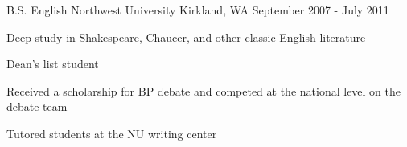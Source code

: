 

\begin{cventries}

  \cventry
    {B.S. English} %
    {Northwest University} %
    {Kirkland, WA} %
    {September 2007 - July 2011} %
    {
      \begin{cvitems} %
        \item {Deep study in Shakespeare, Chaucer, and other classic English literature}
        \item {Dean's list student}
        \item {Received a scholarship for BP debate and competed at the national level on the debate team}
        \item {Tutored students at the NU writing center}
      \end{cvitems}
    }

\end{cventries}

